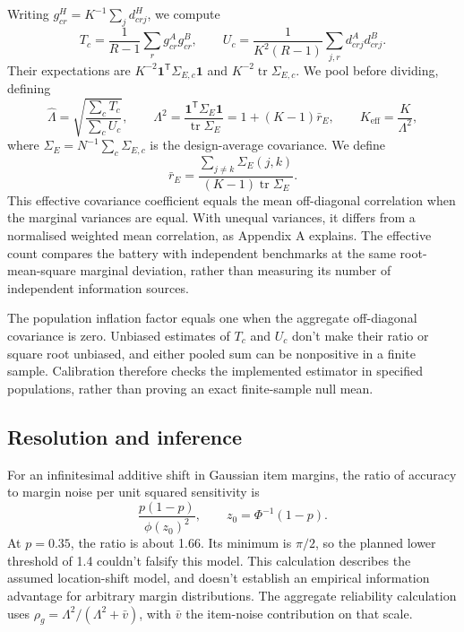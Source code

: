 \documentclass{article}
\newcommand{\Lam}{\Lambda}
\newcommand{\Sig}{\Sigma_E}
\begin{document}
Writing $g^H_{cr}=K^{-1}\sum_j d^H_{crj}$, we compute
\begin{equation}
T_c=\frac{1}{R-1}\sum_r g^A_{cr}g^B_{cr},\qquad
U_c=\frac{1}{K^2(R-1)}\sum_{j,r}d^A_{crj}d^B_{crj}.
\label{eq:tu}
\end{equation}
Their expectations are $K^{-2}\mathbf{1}^{\mathsf T}\Sigma_{E,c}\mathbf{1}$ and $K^{-2}\operatorname{tr}\Sigma_{E,c}$. We pool before dividing, defining
\begin{equation}
\widehat\Lam=\sqrt{\frac{\sum_c T_c}{\sum_c U_c}},\qquad
\Lam^2=\frac{\mathbf{1}^{\mathsf T}\Sig\mathbf{1}}{\operatorname{tr}\Sig}
=1+(K-1)\bar r_E,\qquad K_{\mathrm{eff}}=\frac{K}{\Lam^2},
\label{eq:lambda}
\end{equation}
where $\Sig=N^{-1}\sum_c\Sigma_{E,c}$ is the design-average covariance. We define
\begin{equation}
\bar r_E=\frac{\sum_{j\ne k}\Sigma_E(j,k)}{(K-1)\operatorname{tr}\Sig}.
\label{eq:effective}
\end{equation}
This effective covariance coefficient equals the mean off-diagonal correlation when the marginal variances are equal. With unequal variances, it differs from a normalised weighted mean correlation, as Appendix A explains. The effective count compares the battery with independent benchmarks at the same root-mean-square marginal deviation, rather than measuring its number of independent information sources.

The population inflation factor equals one when the aggregate off-diagonal covariance is zero. Unbiased estimates of $T_c$ and $U_c$ don't make their ratio or square root unbiased, and either pooled sum can be nonpositive in a finite sample. Calibration therefore checks the implemented estimator in specified populations, rather than proving an exact finite-sample null mean.

\subsection{Resolution and inference}
For an infinitesimal additive shift in Gaussian item margins, the ratio of accuracy to margin noise per unit squared sensitivity is
\begin{equation}
\frac{p(1-p)}{\phi(z_0)^2},\qquad z_0=\Phi^{-1}(1-p).
\label{eq:information}
\end{equation}
At $p=0.35$, the ratio is about 1.66. Its minimum is $\pi/2$, so the planned lower threshold of 1.4 couldn't falsify this model. This calculation describes the assumed location-shift model, and doesn't establish an empirical information advantage for arbitrary margin distributions. The aggregate reliability calculation uses $\rho_g=\Lam^2/(\Lam^2+\bar v)$, with $\bar v$ the item-noise contribution on that scale.
\end{document}

